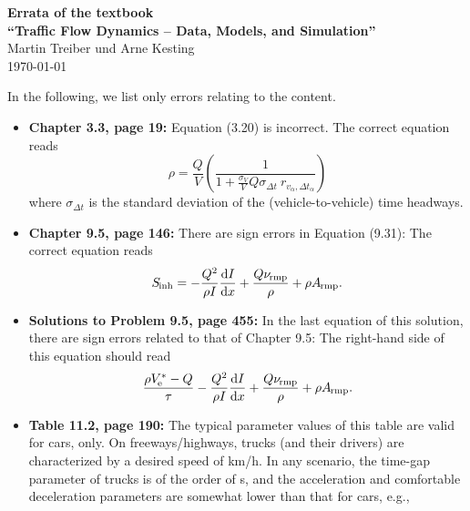 \documentclass[11pt,a4paper]{scrreprt}
\providecommand{\be}{\begin{equation}}
\providecommand{\ee}{\end{equation}}
\providecommand{\bdm}{\begin{displaymath}}
\providecommand{\edm}{\end{displaymath}}
\providecommand{\secfont}[1]{{\Large\sf\textbf{#1}}}
\providecommand{\abl}[2]{\frac{{\rm d} #1}{{\rm d} #2}}  %
\providecommand{\sub}[1]{_{\text{{\scriptsize \hspace{-0.2ex}#1}}}}
\begin{document}
\begin{center}
\secfont{Errata of the textbook\\[0.3em]
``Traffic Flow Dynamics --  Data, Models, and Simulation''}
\\[1em]

Martin Treiber und Arne Kesting
\\[1em]

\today
\end{center}
\vspace{1em}


In the following, we list only errors relating to the content.


\begin{itemize}

\item
\textbf{Chapter 3.3, page 19:}
Equation (3.20) is incorrect. The correct equation reads 
\setcounter{chapter}{3}
\setcounter{equation}{20}
\be
\rho=\frac{Q}{V}\left(\frac{1}{1+\frac{\sigma_V}{V}Q\sigma_{\Delta t} \
r_{v_{\alpha},\Delta t_{\alpha}}}\right)
\ee
where $\sigma_{\Delta t}$ is the standard deviation of the
(vehicle-to-vehicle) time headways.

\item
\textbf{Chapter 9.5, page 146:}
There are sign errors in Equation (9.31): The correct equation reads
\setcounter{chapter}{9}
\setcounter{equation}{30}
\be
S\sub{inh}=-\frac{Q^2}{\rho I} \abl{I}{x}
+\frac{Q \nu\sub{rmp}}{\rho}+\rho A\sub{rmp}.
\ee

\item \textbf{Solutions to Problem 9.5, page 455:}
In the last equation of this solution, there are sign errors related to that of Chapter
9.5: The right-hand side of this equation should read
\bdm
\frac{\rho V^*\sub{e}-Q}{\tau} -\frac{Q^2}{\rho I} \abl{I}{x}
+\frac{Q \nu\sub{rmp}}{\rho}+\rho A\sub{rmp}.
\edm


\item \textbf{Table 11.2, page 190:}
The typical parameter values of this table are valid for cars, only. On freeways/highways, trucks (and
their drivers) are characterized by a desired speed of
\unit[80]{km/h}. In any scenario, the time-gap parameter of  trucks is
 of the order of \unit[2]{s}, and the 
acceleration and comfortable deceleration parameters are somewhat
lower than that for cars, e.g.,


\end{itemize}
\end{document}
